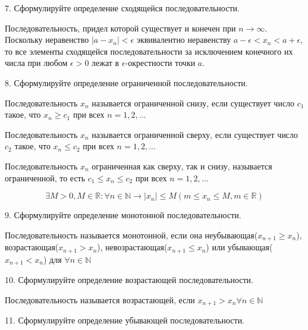 \documentclass[a4paper, 10pt]{article}
\begin{document}
    \begin{bf}7. Сформулируйте определение сходящейся последовательности.\end{bf}

    Последовательность, придел которой существует и конечен при $n \to \infty$. Поскольку 
    неравенство $|a - x_n| < \epsilon$ эквивалентно неравенству 
    $a - \epsilon < x_n < a + \epsilon$, то все элементы сходящейся последовательности 
    за исключением конечного их числа при любом $\epsilon > 0$ лежат в $\epsilon$-окрестности 
    точки $a$.

    \begin{bf}8. Сформулируйте определение ограниченной последовательности.\end{bf}

    Последовательность ${x_n}$ называется ограниченной снизу, если существует число $c_1$
    такое, что $x_n  \geqslant  c_1$ при всех $n = 1, 2, ...$

    Последовательность ${x_n}$ называется ограниченной сверху, если существует число $c_2$
    такое, что $x_n  \leqslant  c_2$ при всех $n = 1, 2, ...$

    Последовательность ${x_n}$ ограниченная как сверху, так и снизу, называется ограниченной,
    то есть $c_1  \leqslant  x_n  \leqslant  c_2$ при всех $n = 1, 2, ...$

    $$\exists M > 0, M \in \mathbb{R}: \forall n \in \mathbb{N} \longrightarrow |x_n|  \leqslant  M 
    (m  \leqslant  x_n  \leqslant  M, m \in \mathbb{R})$$

    \begin{bf}9. Сформулируйте определение монотонной последовательности.\end{bf}
    
    Последовательность называется монотонной, если она неубывающая($x_{n+1} \geqslant x_n$), возрастающая($x_{n+1}>x_n$), 
    невозрастающая($x_{n+1} \leqslant x_n$) или убывающая($x_{n+1}<x_n$) для $\forall n \in \mathbb{N}$

    \begin{bf}10. Сформулируйте определение возрастающей последовательности.\end{bf}

    Последовательность называется возрастающей, если $x_{n+1} > x_n \forall n \in \mathbb{N}$
        
    \begin{bf}11. Сформулируйте определение убывающей последовательности.\end{bf}
\end{document}
